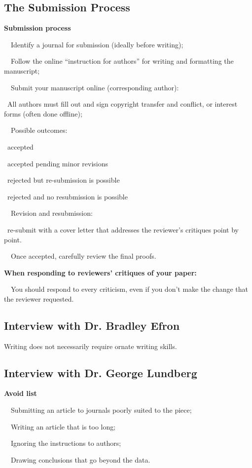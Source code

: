 \documentclass[a4paper, 12pt]{article}
\begin{document}
\newpage\subsection{The Submission Process}

\textbf{Submission process}
\par\ \textbullet\ Identify a journal for submission (ideally before writing);
\par\ \textbullet\ Follow the online ``instruction for authors'' for writing and formatting the manuscript;
\par\ \textbullet\ Submit your manuscript online (corresponding author):
\par\quad\textopenbullet\ All authors must fill out and sign copyright transfer and conflict, or interest forms (often done offline);
\par\ \textbullet\ Possible outcomes:
\par\quad\textopenbullet\ accepted
\par\quad\textopenbullet\ accepted pending minor revisions
\par\quad\textopenbullet\ rejected but re-submission is possible
\par\quad\textopenbullet\ rejected and no resubmission is possible
\par\ \textbullet\ Revision and resubmission:
\par\quad\textopenbullet\ re-submit with a cover letter that addresses the reviewer's critiques point by point.
\par\ \textbullet\ Once accepted, carefully review the final proofs.

\textbf{When responding to reviewers' critiques of your paper:}
\par\ \textbullet\ You should respond to every criticism, even if you don't make the change that the reviewer requested.

\subsection{Interview with Dr. Bradley Efron}

\par Writing does not necessarily require ornate writing skills.

\newpage\subsection{Interview with Dr. George Lundberg}

\textbf{Avoid list}
\par\ \textbullet\ Submitting an article to journals poorly suited to the piece;
\par\ \textbullet\ Writing an article that is too long;
\par\ \textbullet\ Ignoring the instructions to authors;
\par\ \textbullet\ Drawing conclusions that go beyond the data.
\end{document}

